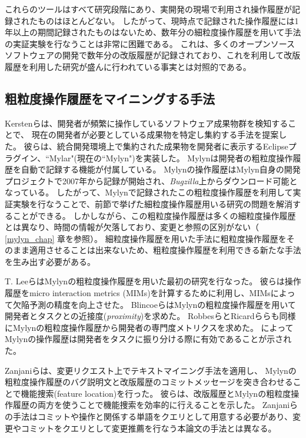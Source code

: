 \documentclass[a4paper]{jsbook}
\begin{document}
これらのツールはすべて研究段階にあり、実開発の現場で利用され操作履歴が記録されたものはほとんどない。
したがって、現時点で記録された操作履歴には1年以上の期間記録されたものはないため、数年分の細粒度操作履歴を用いて手法の実証実験を行なうことは非常に困難である。
これは、多くのオープンソースソフトウェアの開発で数年分の改版履歴が記録されており、これを利用して改版履歴を利用した研究が盛んに行われている事実とは対照的である。
\subsection{粗粒度操作履歴をマイニングする手法}\label{coarse_sec}
Kerstenらは、開発者が頻繁に操作しているソフトウェア成果物群を検知することで、
現在の開発者が必要としている成果物を特定し集約する手法を提案した。
彼らは、統合開発環境上で集約された成果物を開発者に表示するEclipseプラグイン、``Mylar"(現在の``Mylyn")\cite{Kersten:2005}を実装した。
Mylynは開発者の粗粒度操作履歴を自動で記録する機能が付属している。
Mylynの操作履歴はMylyn自身の開発プロジェクトで2007年から記録が開始され、{\it Bugzilla}上からダウンロード可能となっている。
したがって、Mylynで記録されたこの粗粒度操作履歴を利用して実証実験を行なうことで、前節で挙げた細粒度操作履歴用いる研究の問題を解消することができる。
しかしながら、この粗粒度操作履歴は多くの細粒度操作履歴とは異なり、時間の情報が欠落しており、変更と参照の区別がない（ \ref{mylyn_chap} 章を参照）。
細粒度操作履歴を用いた手法に粗粒度操作履歴をそのまま適用させることは出来ないため、粗粒度操作履歴を利用できる新たな手法を生み出す必要がある。

T. Leeら\cite{TLee:2011}はMylynの粗粒度操作履歴を用いた最初の研究を行なった。
彼らは操作履歴をmicro interaction metrics (MIMs)を計算するために利用し、MIMsによって欠陥予測の精度を向上させた。
Blincoeら\cite{Blincoe:2012}はMylynの粗粒度操作履歴を用いて開発者とタスクとの近接度({\it proximity})を求めた。
Robbesら\cite{Robbes:2013}とRicardら\cite{Silva:2015}らも同様にMylynの粗粒度操作履歴から開発者の専門度メトリクスを求めた。
\cite{Blincoe:2012,Robbes:2013,Silva:2015}によってMylynの操作履歴は開発者をタスクに振り分ける際に有効であることが示された。

Zanjaniら\cite{Zanjani:2014}は、変更リクエスト上でテキストマイニング手法を適用し、
Mylynの粗粒度操作履歴のバグ説明文と改版履歴のコミットメッセージを突き合わせることで機能捜索(feature location)を行った。
彼らは、改版履歴とMylynの粗粒度操作履歴の両方を使うことで機能捜索を効率的に行えることを示した。
Zanjaniらの手法はコミットや操作と関係する単語をクエリとして用意する必要があり、変更やコミットをクエリとして変更推薦を行なう本論文の手法とは異なる。
\end{document}
